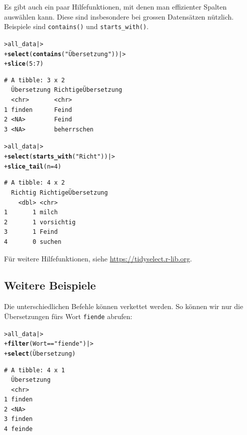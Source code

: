 \documentclass[oneside, 10pt]{book}\usepackage[]{graphicx}\usepackage[]{xcolor}
\makeatletter
\newcommand{\hlnum}[1]{\textcolor[rgb]{0.686,0.059,0.569}{#1}}%
\newcommand{\hlstr}[1]{\textcolor[rgb]{0.192,0.494,0.8}{#1}}%
\newcommand{\hlopt}[1]{\textcolor[rgb]{0,0,0}{#1}}%
\newcommand{\hlstd}[1]{\textcolor[rgb]{0.345,0.345,0.345}{#1}}%
\newcommand{\hlkwc}[1]{\textcolor[rgb]{0.333,0.667,0.333}{#1}}%
\newcommand{\hlkwd}[1]{\textcolor[rgb]{0.737,0.353,0.396}{\textbf{#1}}}%
\newenvironment{kframe}{%
 \def\at@end@of@kframe{}%
 \ifinner\ifhmode%
  \def\at@end@of@kframe{\end{minipage}}%
  \begin{minipage}{\columnwidth}%
 \fi\fi%
 \def\FrameCommand##1{\hskip\@totalleftmargin \hskip-\fboxsep
 \colorbox{shadecolor}{##1}\hskip-\fboxsep
     \hskip-\linewidth \hskip-\@totalleftmargin \hskip\columnwidth}%
 \MakeFramed {\advance\hsize-\width
   \@totalleftmargin\z@ \linewidth\hsize
   \@setminipage}}%
 {\par\unskip\endMakeFramed%
 \at@end@of@kframe}
\newenvironment{knitrout}{}{} %
\makeatother
\begin{document}
Es gibt auch ein paar Hilfefunktionen,
mit denen man effizienter Spalten auswählen kann.
Diese sind insbesondere bei grossen Datensätzen nützlich.
Beispiele sind \texttt{contains()} und \texttt{starts\_with()}.
\begin{knitrout}
\color{fgcolor}\begin{kframe}
\begin{alltt}
\hlstd{> }\hlstd{all_data |>}
\hlstd{+ }  \hlkwd{select}\hlstd{(}\hlkwd{contains}\hlstd{(}\hlstr{"Übersetzung"}\hlstd{)) |>}
\hlstd{+ }  \hlkwd{slice}\hlstd{(}\hlnum{5}\hlopt{:}\hlnum{7}\hlstd{)}
\end{alltt}
\begin{verbatim}
# A tibble: 3 x 2
  Übersetzung RichtigeÜbersetzung
  <chr>       <chr>              
1 finden      Feind              
2 <NA>        Feind              
3 <NA>        beherrschen        
\end{verbatim}
\begin{alltt}
\hlstd{> }\hlstd{all_data |>}
\hlstd{+ }  \hlkwd{select}\hlstd{(}\hlkwd{starts_with}\hlstd{(}\hlstr{"Richt"}\hlstd{)) |>}
\hlstd{+ }  \hlkwd{slice_tail}\hlstd{(}\hlkwc{n} \hlstd{=} \hlnum{4}\hlstd{)}
\end{alltt}
\begin{verbatim}
# A tibble: 4 x 2
  Richtig RichtigeÜbersetzung
    <dbl> <chr>              
1       1 milch              
2       1 vorsichtig         
3       1 Feind              
4       0 suchen             
\end{verbatim}
\end{kframe}
\end{knitrout}

Für weitere Hilfefunktionen,
siehe \url{https://tidyselect.r-lib.org}.

\subsection{Weitere Beispiele}
Die unterschiedlichen Befehle können verkettet werden.
So können wir nur die Übersetzungen fürs Wort \texttt{fiende}
abrufen:
\begin{knitrout}
\color{fgcolor}\begin{kframe}
\begin{alltt}
\hlstd{> }\hlstd{all_data |>}
\hlstd{+ }  \hlkwd{filter}\hlstd{(Wort} \hlopt{==} \hlstr{"fiende"}\hlstd{) |>}
\hlstd{+ }  \hlkwd{select}\hlstd{(Übersetzung)}
\end{alltt}
\begin{verbatim}
# A tibble: 4 x 1
  Übersetzung
  <chr>      
1 finden     
2 <NA>       
3 finden     
4 feinde     
\end{verbatim}
\end{kframe}
\end{knitrout}
\end{document}
